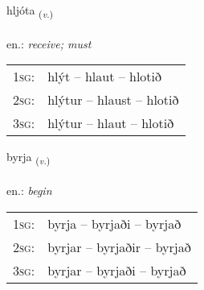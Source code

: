 \documentclass[frontgrid, backgrid]{flacards}\usepackage[]{graphicx}\usepackage[]{xcolor}
\begin{document}
\renewcommand{\blhead}{\vskip5pt {\small\bfseries\footnotesize Sagnorð | Verb }}
\renewcommand{\bcfoot}{\vskip5pt \hspace{2pt}{\small\bfseries\footnotesize 1K}}


{hljóta \small{\textsubscript{(\textit{v.})}} \\[1ex] %
\textphonetic{[l̥jouːta]} \\
en.: \emph{receive; must} \\  [2ex]
\renewcommand*{\arraystretch}{0.8}
\begin{tabular}{p{1cm}l}
\textsc{1sg}: & hlýt -- hlaut -- hlotið \\ 
\textsc{2sg}: & hlýtur -- hlaust -- hlotið \\ 
\textsc{3sg}: & hlýtur -- hlaut -- hlotið \\ 
\end{tabular}
}

\renewcommand{\flhead}{\vskip5pt \fboxsep=0pt {\small\bfseries\footnotesize Sagnorð | Verb}}
\renewcommand{\fcfoot}{\vskip5pt \fboxsep=0pt \hspace{2pt}{\small\bfseries\footnotesize 1K}}

\renewcommand{\blhead}{\vskip5pt {\small\bfseries\footnotesize Sagnorð | Verb }}
\renewcommand{\bcfoot}{\vskip5pt \hspace{2pt}{\small\bfseries\footnotesize 1K}}


{byrja \small{\textsubscript{(\textit{v.})}} \\[1ex] %
\textphonetic{[pɪrja]} \\
en.: \emph{begin} \\  [2ex]
\renewcommand*{\arraystretch}{0.8}
\begin{tabular}{p{1cm}l}
\textsc{1sg}: & byrja -- byrjaði -- byrjað \\ 
\textsc{2sg}: & byrjar -- byrjaðir -- byrjað \\ 
\textsc{3sg}: & byrjar -- byrjaði -- byrjað \\ 
\end{tabular}
}
\end{document}
